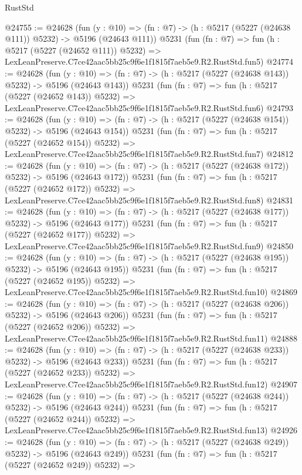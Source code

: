 \begin{lexlean}{RustStd}
\begin{coremodule}
@24755 := @24628
    (fun (y : @10) => (fn : @7) -> (h : @5217 (@5227 (@24638 @111)) @5232) -> @5196 (@24643 @111))
    @5231
    (fun (fn : @7) =>
    fun (h : @5217 (@5227 (@24652 @111)) @5232) =>
    LexLeanPreserve.C7ce42aac5bb25c9f6e1f1815f7aeb5e9.R2.RustStd.fun5)
@24774 := @24628
    (fun (y : @10) => (fn : @7) -> (h : @5217 (@5227 (@24638 @143)) @5232) -> @5196 (@24643 @143))
    @5231
    (fun (fn : @7) =>
    fun (h : @5217 (@5227 (@24652 @143)) @5232) =>
    LexLeanPreserve.C7ce42aac5bb25c9f6e1f1815f7aeb5e9.R2.RustStd.fun6)
@24793 := @24628
    (fun (y : @10) => (fn : @7) -> (h : @5217 (@5227 (@24638 @154)) @5232) -> @5196 (@24643 @154))
    @5231
    (fun (fn : @7) =>
    fun (h : @5217 (@5227 (@24652 @154)) @5232) =>
    LexLeanPreserve.C7ce42aac5bb25c9f6e1f1815f7aeb5e9.R2.RustStd.fun7)
@24812 := @24628
    (fun (y : @10) => (fn : @7) -> (h : @5217 (@5227 (@24638 @172)) @5232) -> @5196 (@24643 @172))
    @5231
    (fun (fn : @7) =>
    fun (h : @5217 (@5227 (@24652 @172)) @5232) =>
    LexLeanPreserve.C7ce42aac5bb25c9f6e1f1815f7aeb5e9.R2.RustStd.fun8)
@24831 := @24628
    (fun (y : @10) => (fn : @7) -> (h : @5217 (@5227 (@24638 @177)) @5232) -> @5196 (@24643 @177))
    @5231
    (fun (fn : @7) =>
    fun (h : @5217 (@5227 (@24652 @177)) @5232) =>
    LexLeanPreserve.C7ce42aac5bb25c9f6e1f1815f7aeb5e9.R2.RustStd.fun9)
@24850 := @24628
    (fun (y : @10) => (fn : @7) -> (h : @5217 (@5227 (@24638 @195)) @5232) -> @5196 (@24643 @195))
    @5231
    (fun (fn : @7) =>
    fun (h : @5217 (@5227 (@24652 @195)) @5232) =>
    LexLeanPreserve.C7ce42aac5bb25c9f6e1f1815f7aeb5e9.R2.RustStd.fun10)
@24869 := @24628
    (fun (y : @10) => (fn : @7) -> (h : @5217 (@5227 (@24638 @206)) @5232) -> @5196 (@24643 @206))
    @5231
    (fun (fn : @7) =>
    fun (h : @5217 (@5227 (@24652 @206)) @5232) =>
    LexLeanPreserve.C7ce42aac5bb25c9f6e1f1815f7aeb5e9.R2.RustStd.fun11)
@24888 := @24628
    (fun (y : @10) => (fn : @7) -> (h : @5217 (@5227 (@24638 @233)) @5232) -> @5196 (@24643 @233))
    @5231
    (fun (fn : @7) =>
    fun (h : @5217 (@5227 (@24652 @233)) @5232) =>
    LexLeanPreserve.C7ce42aac5bb25c9f6e1f1815f7aeb5e9.R2.RustStd.fun12)
@24907 := @24628
    (fun (y : @10) => (fn : @7) -> (h : @5217 (@5227 (@24638 @244)) @5232) -> @5196 (@24643 @244))
    @5231
    (fun (fn : @7) =>
    fun (h : @5217 (@5227 (@24652 @244)) @5232) =>
    LexLeanPreserve.C7ce42aac5bb25c9f6e1f1815f7aeb5e9.R2.RustStd.fun13)
@24926 := @24628
    (fun (y : @10) => (fn : @7) -> (h : @5217 (@5227 (@24638 @249)) @5232) -> @5196 (@24643 @249))
    @5231
    (fun (fn : @7) =>
    fun (h : @5217 (@5227 (@24652 @249)) @5232) =>

\end{coremodule}
\end{lexlean}
